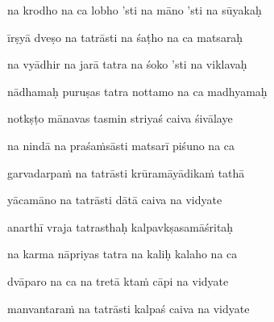 na krodho na ca lobho 'sti na māno 'sti na sūyakaḥ\thinspace{\dandab} \dontdisplaylinenum

īrṣyā dveṣo na tatrāsti na śaṭho na ca matsaraḥ \veg\dontdisplaylinenum
{}

na vyādhir na jarā tatra na śoko 'sti na viklavaḥ\thinspace{\dandab} \dontdisplaylinenum

nādhamaḥ puruṣas tatra nottamo na ca madhyamaḥ \veg\dontdisplaylinenum
{}

notkṣṭo mānavas tasmin striyaś caiva śivālaye\thinspace{\dandab} \dontdisplaylinenum

na nindā na praśaṁsāsti matsarī piśuno na ca \veg\dontdisplaylinenum
{}

garvadarpaṁ na tatrāsti krūramāyādikaṁ tathā\thinspace{\dandab} \dontdisplaylinenum

yācamāno na tatrāsti dātā caiva na vidyate \veg\dontdisplaylinenum
{}

anarthī vraja tatrasthaḥ kalpavkṣasamāśritaḥ\thinspace{\dandab} \dontdisplaylinenum

na karma nāpriyas tatra na kaliḥ kalaho na ca \veg\dontdisplaylinenum
{}

dvāparo na ca na tretā ktaṁ cāpi na vidyate\thinspace{\dandab} \dontdisplaylinenum

manvantaraṁ na tatrāsti kalpaś caiva na vidyate \veg\dontdisplaylinenum
{}

